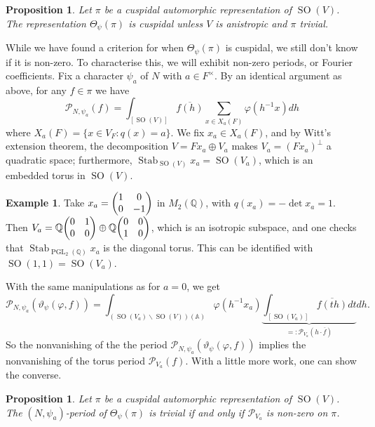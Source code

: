 \documentclass[11pt,a4paper,leqno]{article}
\let\mc\mathcal
\newcommand{\A}{\mathbb{A}}
\newcommand{\1}{\mathbbm{1}}
\newcommand{\Q}{\mathbb{Q}}
\renewcommand{\bar}{\overline}
\renewcommand{\phi}{\varphi}
\renewcommand{\theta}{\vartheta}
\DeclareMathOperator{\Stab}{Stab}
\DeclareMathOperator{\SO}{SO}
\DeclareMathOperator{\PGL}{PGL}
\theoremstyle{plain}
\newtheorem{prop}[theorem]{Proposition}
\theoremstyle{definition}
\newtheorem{example}[theorem]{Example}
\theoremstyle{remark}
\numberwithin{equation}{section}
\begin{document}
\begin{prop}
  Let $\pi$ be a cuspidal automorphic representation of $\SO(V)$. The
  representation $\Theta_{\psi}(\pi)$ is cuspidal unless $V$ is anistropic and
  $\pi$ trivial.
\end{prop}

While we have found a criterion for when $\Theta_{\psi}(\pi)$ is cuspidal, we
still don't know if it is non-zero. To characterise this, we will exhibit non-zero
periods, or Fourier coefficients. Fix a character $\psi_{a}$ of $N$ with
$a \in F^{\times}$. By an identical argument as above, for any $f\in \pi$ we have
\begin{equation}
  \label{eq:40}
\mc P_{N,\psi_{a}}(f) = \int_{[\SO(V)]}\overline{f(h)}\sum_{x \in
  X_{a}(F)}\phi(h^{-1}x) dh
\end{equation}
where $X_{a}(F) = \{x \in V_{F} : q(x) = a\}$. We fix $x_{a} \in
X_{a}(F)$, and by Witt's extension theorem, the
decomposition $V = Fx_{a} \oplus V_{a}$ makes $V_{a} = (Fx_{a})^{\perp}$ a
quadratic space; furthermore, $\Stab_{\SO(V)} x_{a} = \SO(V_{a})$,
which is an embedded torus in $\SO(V)$.
\begin{example}
Take $x_{a} = \mqty(1  & 0 \\ 0 & -1)$ in $M_{2}(\Q)$, with $q(x_{a})
= -\det x_{a} = 1$. Then $V_{a} = \Q \mqty(0  & 1 \\ 0 & 0) \oplus \Q
\mqty(0  & 0 \\ 1 & 0)$, which is an isotropic subspace, and one
checks that $\Stab_{\PGL_{2}(\Q)}x_{a}$ is the diagonal
torus. This can be identified with $\SO(1,1) = \SO(V_{a})$.
\end{example}
With the same manipulations as for $a = 0$, we get
\begin{equation}
  \label{eq:41}
\mc P_{N,\psi_{a}}(\theta_{\psi}(\phi,f)) = \int_{(\SO(V_{a})\backslash
  \SO(V))(\A)}\phi(h^{-1}x_{a}) \underbrace{\int_{[\SO(V_{a})]}
  \overline{f(th)}dt}_{=: \mc{P}_{V_{a}}(h\cdot \bar f)}dh.
\end{equation}
So the nonvanishing of the the period $\mc P_{N,\psi_{a}}(\theta_{\psi}(\phi,f))$
implies the nonvanishing of the torus period $\mc P_{V_{a}}(f)$. With
a little more work, one can show the converse.

\begin{prop}
  Let $\pi$ be a cuspidal automorphic representation of $\SO(V)$. The
  $(N,\psi_{a})$-period of $\Theta_{\psi}(\pi)$ is trivial if and only if $\mc
  P_{V_{a}}$ is non-zero on $\pi$. 
\end{prop}
\end{document}
